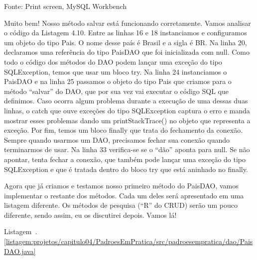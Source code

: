 Fonte: Print screen, MySQL Workbench

Muito bem! Nosso método salvar está funcionando corretamente. Vamos analisar o código da Listagem 4.10. Entre as linhas 16 e 18 instanciamos e configuramos um objeto do tipo Pais. O nome desse país é Brasil e a sigla é BR. Na linha 20, declaramos uma referência do tipo PaisDAO que foi inicializada com null. Como todo o código dos métodos do DAO podem lançar uma exceção do tipo SQLException, temos que usar um bloco try. Na linha 24 instanciamos o PaisDAO e na linha 25 passamos o objeto do tipo Pais que criamos para o método ``salvar'' do DAO, que por sua vez vai executar o código SQL que definimos. Caso ocorra algum problema durante a execução de uma dessas duas linhas, o catch que ouve exceções do tipo SQLException captura o erro e manda mostrar esses problemas dando um printStackTrace() no objeto que representa a exceção. Por fim, temos um bloco finally que trata do fechamento da conexão. Sempre quando usarmos um DAO, precisamos fechar sua conexão quando terminarmos de usar. Na linha 33 verifica-se se o ``dão'' aponta para null. Se não apontar, tenta fechar a conexão, que também pode lançar uma exceção do tipo SQLException e que é tratada dentro do bloco try que está aninhado no finally.

Agora que já criamos e testamos nosso primeiro método do PaisDAO, vamos implementar o restante dos métodos. Cada um deles será apresentado em uma listagem diferente. Os métodos de pesquisa (``R'' do CRUD) serão um pouco diferente, sendo assim, eu os discutirei depois. Vamos lá!

Listagem~\thechapter.\ref{listagem:projetos/capitulo04/PadroesEmPratica/src/padroesempratica/dao/PaisDAO.java}

